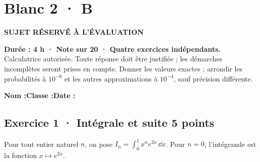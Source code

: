 \fi

\fi

\ifmxteacher

\mxnewpage{}\label{sujet:8-4}

\section*{Blanc 2 · B}

{\sffamily\bfseries\color{mxwarn}SUJET RÉSERVÉ À L'ÉVALUATION\par}

\textbf{Durée : 4 h · Note sur 20 · Quatre exercices indépendants.}\\Calculatrice autorisée. Toute réponse doit être justifiée ; les démarches incomplètes seront prises en compte. Donner les valeurs exactes ; arrondir les probabilités à $10^{-6}$ et les autres approximations à $10^{-4}$, sauf précision différente.

\smallskip\textbf{Nom :}\enspace\dotfill\quad\textbf{Classe :}\enspace\dotfill\quad\textbf{Date :}\enspace\dotfill

\subsection*{Exercice 1 · Intégrale et suite \hfill 5 points}Pour tout entier naturel $n$, on pose $I_n=\displaystyle\int_0^1x^ne^{2x}\,\dd x$. Pour $n=0$, l'intégrande est la fonction $x\mapsto e^{2x}$.

